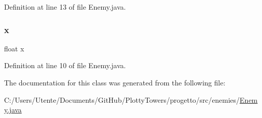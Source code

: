 Definition at line 13 of file Enemy.\+java.

\mbox{\label{classenemies_1_1_enemy_ad0da36b2558901e21e7a30f6c227a45e}} 
\subsubsection{\texorpdfstring{x}{x}}
{\footnotesize\ttfamily float x\hspace{0.3cm}{\ttfamily [private]}}



Definition at line 10 of file Enemy.\+java.



The documentation for this class was generated from the following file\+:\begin{DoxyCompactItemize}
\item 
C\+:/\+Users/\+Utente/\+Documents/\+Git\+Hub/\+Plotty\+Towers/progetto/src/enemies/\hyperlink{_enemy_8java}{Enemy.\+java}\end{DoxyCompactItemize}
